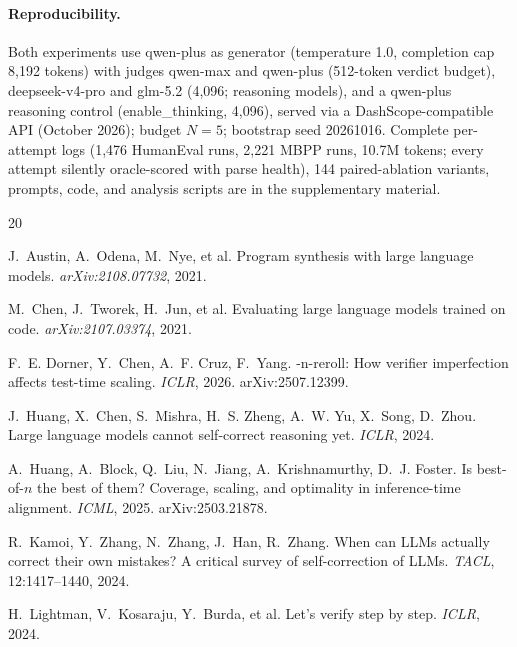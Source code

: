 \documentclass[10pt]{article}
\begin{document}
\paragraph{Reproducibility.}
Both experiments use qwen-plus as generator (temperature 1.0,
completion cap 8{,}192 tokens) with judges qwen-max and qwen-plus
(512-token verdict budget), deepseek-v4-pro and glm-5.2 (4{,}096;
reasoning models), and a qwen-plus reasoning control
(enable\_thinking, 4{,}096), served via a DashScope-compatible API
(October 2026); budget $N{=}5$; bootstrap seed 20261016.  Complete
per-attempt logs (1{,}476 HumanEval runs, 2{,}221 MBPP runs,
10.7M tokens; every attempt silently oracle-scored with parse
health), 144 paired-ablation variants, prompts, code, and
analysis scripts are in the supplementary material.

\begin{thebibliography}{20}

J.~Austin, A.~Odena, M.~Nye, et al.
\newblock Program synthesis with large language models.
\newblock \emph{arXiv:2108.07732}, 2021.

M.~Chen, J.~Tworek, H.~Jun, et al.
\newblock Evaluating large language models trained on code.
\newblock \emph{arXiv:2107.03374}, 2021.

F.~E. Dorner, Y.~Chen, A.~F. Cruz, F.~Yang.
-n-reroll: How verifier imperfection affects
test-time scaling.
\newblock \emph{ICLR}, 2026. arXiv:2507.12399.

J.~Huang, X.~Chen, S.~Mishra, H.~S. Zheng, A.~W. Yu, X.~Song,
D.~Zhou.
\newblock Large language models cannot self-correct reasoning yet.
\newblock \emph{ICLR}, 2024.

A.~Huang, A.~Block, Q.~Liu, N.~Jiang, A.~Krishnamurthy,
D.~J. Foster.
\newblock Is best-of-$n$ the best of them? Coverage, scaling, and
optimality in inference-time alignment.
\newblock \emph{ICML}, 2025. arXiv:2503.21878.

R.~Kamoi, Y.~Zhang, N.~Zhang, J.~Han, R.~Zhang.
\newblock When can {LLM}s actually correct their own mistakes? {A}
critical survey of self-correction of {LLM}s.
\newblock \emph{TACL}, 12:1417--1440, 2024.

H.~Lightman, V.~Kosaraju, Y.~Burda, et al.
\newblock Let's verify step by step.
\newblock \emph{ICLR}, 2024.


\end{thebibliography}
\end{document}
